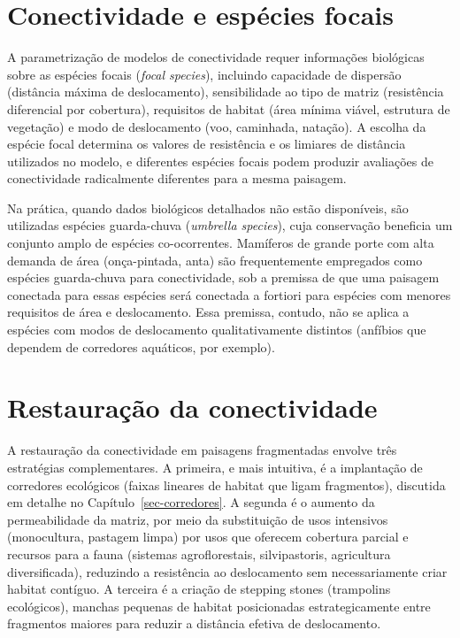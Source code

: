 \documentclass[
  portuguese,
  11pt,
  a4paper,
  open=any]{scrbook}
\begin{document}
\section{Conectividade e espécies
focais}\label{conectividade-e-espuxe9cies-focais}

A parametrização de modelos de conectividade requer informações
biológicas sobre as espécies focais (\emph{focal species}), incluindo
capacidade de dispersão (distância máxima de deslocamento),
sensibilidade ao tipo de matriz (resistência diferencial por cobertura),
requisitos de habitat (área mínima viável, estrutura de vegetação) e
modo de deslocamento (voo, caminhada, natação). A escolha da espécie
focal determina os valores de resistência e os limiares de distância
utilizados no modelo, e diferentes espécies focais podem produzir
avaliações de conectividade radicalmente diferentes para a mesma
paisagem.

Na prática, quando dados biológicos detalhados não estão disponíveis,
são utilizadas espécies guarda-chuva (\emph{umbrella species}), cuja
conservação beneficia um conjunto amplo de espécies co-ocorrentes.
Mamíferos de grande porte com alta demanda de área (onça-pintada, anta)
são frequentemente empregados como espécies guarda-chuva para
conectividade, sob a premissa de que uma paisagem conectada para essas
espécies será conectada a fortiori para espécies com menores requisitos
de área e deslocamento. Essa premissa, contudo, não se aplica a espécies
com modos de deslocamento qualitativamente distintos (anfíbios que
dependem de corredores aquáticos, por exemplo).

\section{Restauração da
conectividade}\label{sec-restauracao-conectividade}

A restauração da conectividade em paisagens fragmentadas envolve três
estratégias complementares. A primeira, e mais intuitiva, é a
implantação de corredores ecológicos (faixas lineares de habitat que
ligam fragmentos), discutida em detalhe no
Capítulo~\ref{sec-corredores}. A segunda é o aumento da permeabilidade
da matriz, por meio da substituição de usos intensivos (monocultura,
pastagem limpa) por usos que oferecem cobertura parcial e recursos para
a fauna (sistemas agroflorestais, silvipastoris, agricultura
diversificada), reduzindo a resistência ao deslocamento sem
necessariamente criar habitat contíguo. A terceira é a criação de
stepping stones (trampolins ecológicos), manchas pequenas de habitat
posicionadas estrategicamente entre fragmentos maiores para reduzir a
distância efetiva de deslocamento.
\end{document}
